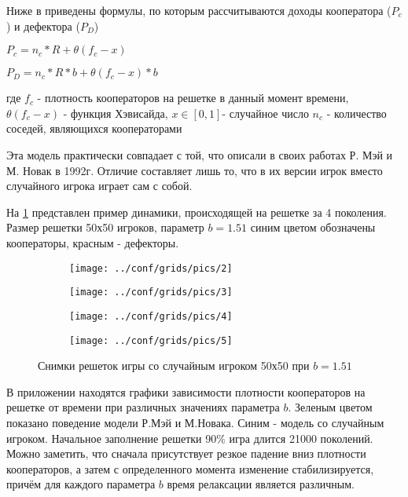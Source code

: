 \documentclass[12pt,a4paper]{article}
\begin{document}
	\par Ниже в приведены формулы, по которым рассчитываются доходы кооператора ($P_{c}$) и дефектора ($P_{D}$)
	
	$ P_{c}= n_{c}*R+ \theta(f_{c}-x) $
	
	$ P_{D}= n_{c}*R*b+ \theta(f_{c}-x)*b $
	
	где $ f_{c}$ - плотность кооператоров на решетке в данный момент
	времени, $\theta(f_{c}-x)$ - функция Хэвисайда, $x \in [0,1]$- случайное число
	$n_{c}$ - количество соседей, являющихся кооператорами
	 
	
	\par Эта модель практически совпадает с той, что описали в своих работах Р. Мэй и
	М. Новак в 1992г. Отличие составляет лишь то, что в их версии игрок вместо случайного
	игрока играет сам с собой.
	
	\par На \ref{fig:1} представлен пример динамики, происходящей на решетке за 4 поколения.
	Размер решетки 50х50 игроков, параметр $b=1.51$ синим цветом обозначены кооператоры, красным - дефекторы. 
	\begin{figure}[H]
		\centering
		\begin{subfigure}{.5\textwidth}
			\texttt{[image: ../conf/grids/pics/2]}
			\caption{}
		\end{subfigure}%
		\begin{subfigure}{.5\textwidth}
			\texttt{[image: ../conf/grids/pics/3]}
			\caption{}
		\end{subfigure}%
	
		\begin{subfigure}{.5\textwidth}
			\texttt{[image: ../conf/grids/pics/4]}
			\caption{}
		\end{subfigure}%
		\begin{subfigure}{.5\textwidth}
			\texttt{[image: ../conf/grids/pics/5]}
			\caption{}
		\end{subfigure}%
		\caption{Снимки решеток игры со случайным игроком 50х50 при $b=1.51$}
		\label{fig:1}
	\end{figure}
	
	В приложении находятся графики зависимости плотности кооператоров на решетке 
	от времени при различных значениях параметра $b$. Зеленым цветом показано поведение
	модели Р.Мэй и М.Новака. Синим - модель со случайным игроком. Начальное заполнение решетки 90$\%$ игра длится 21000 поколений. Можно заметить, что сначала присутствует резкое падение вниз плотности кооператоров, а затем с определенного момента изменение 
	стабилизируется, причём для каждого параметра $b$ время релаксации является различным.
	
\end{document}
